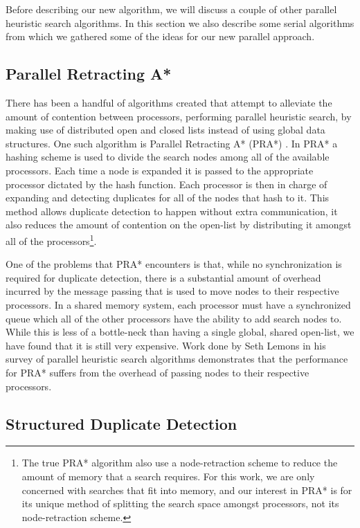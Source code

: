 \documentclass{article}
\begin{document}
Before describing our new algorithm, we will discuss a couple of other
parallel heuristic search algorithms.  In this section we also
describe some serial algorithms from which we gathered some of the
ideas for our new parallel approach.

\subsection{Parallel Retracting A*}

There has been a handful of algorithms created that attempt to
alleviate the amount of contention between processors, performing
parallel heuristic search, by making use of distributed open and
closed lists instead of using global data structures.  One such
algorithm is Parallel Retracting A* (PRA*) \cite{evett:pra}.  In PRA*
a hashing scheme is used to divide the search nodes among all of the
available processors.  Each time a node is expanded it is passed to
the appropriate processor dictated by the hash function.  Each
processor is then in charge of expanding and detecting duplicates for
all of the nodes that hash to it.  This method allows duplicate
detection to happen without extra communication, it also reduces the
amount of contention on the open-list by distributing it amongst all
of the processors\footnote{The true PRA* algorithm also use a
  node-retraction scheme to reduce the amount of memory that a search
  requires.  For this work, we are only concerned with searches that
  fit into memory, and our interest in PRA* is for its unique method
  of splitting the search space amongst processors, not its
  node-retraction scheme.}.

One of the problems that PRA* encounters is that, while no
synchronization is required for duplicate detection, there is a
substantial amount of overhead incurred by the message passing that is
used to move nodes to their respective processors.  In a shared memory
system, each processor must have a synchronized queue which all of the
other processors have the ability to add search nodes to.  While this
is less of a bottle-neck than having a single global, shared
open-list, we have found that it is still very expensive.  Work done
by Seth Lemons in his survey of parallel heuristic search algorithms
\cite{lemons:sur} demonstrates that the performance for PRA* suffers
from the overhead of passing nodes to their respective processors.

\subsection{Structured Duplicate Detection}
\end{document}
